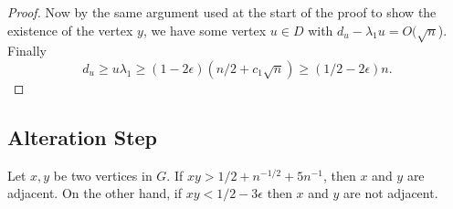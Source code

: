 \begin{proof}
Now by the same argument used at the start of the proof to show the existence
of the vertex $y$, we have some vertex $u \in D$
with $d_u - \lambda_1 u = O(\sqrt{n}$).   Finally 
\[d_u \geq u \lambda_1 \geq (1 - 2 \epsilon) (n/2 + c_1\sqrt{n}) \geq \left( 1/2 - 2\epsilon \right)n .  \]

\end{proof}

\subsection{Alteration Step}

\begin{lemma}\label{modifying conditions}
 Let $x,y$ be two vertices in $G$.  If
 $xy > 1/2 +n^{-1/2} + 5n^{-1}$, then $x$ and $y$ are adjacent.  On the
 other hand, if $xy < 1/2 - 3\epsilon$ then $x$ and $y$ are not adjacent.
\end{lemma}
